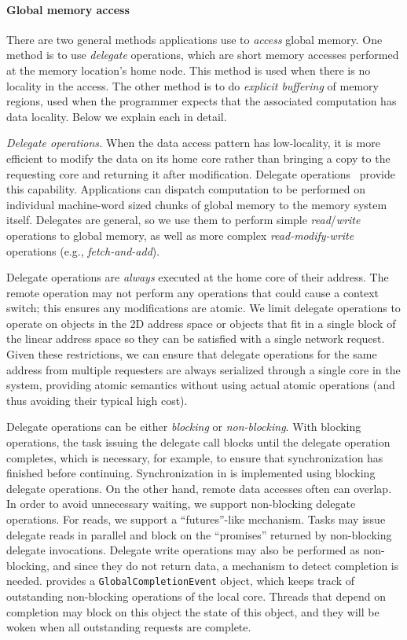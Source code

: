 \paragraph{Global memory access} There are two general methods \Grappa
applications use to {\em access} global memory. One method is to use {\em
delegate} operations, which are short memory accesses performed at the memory
location's home node. This method is used when there is no locality in the
access. The other method is to do {\em explicit buffering} of memory regions,
used when the programmer expects that the associated computation has data
locality. Below we explain each in detail.


\vspace{1ex} \textit{Delegate operations.} When the data access pattern has
low-locality, it is more efficient to modify the data on its home core rather
than bringing a copy to the requesting core and returning it after
modification. Delegate operations~\cite{Nelson:hotpar11, delegated:oopsla11}
provide this capability. Applications can dispatch computation to be performed
on individual machine-word sized chunks of global memory to the memory system
itself. Delegates are general, so we use them to perform simple
\emph{read\/}/\emph{write\/} operations to global memory, as well as more complex \emph{read-modify-write\/} operations (e.g., \emph{fetch-and-add\/}). 

Delegate operations are \emph{always\/} executed at the home core of their
address. The remote operation may not perform any operations that could cause
a context switch; this ensures any modifications are atomic. We limit delegate
operations to operate on objects in the 2D address space or objects that fit
in a single block of the linear address space so they can be satisfied with a
single network request. Given these restrictions, we can ensure that delegate
operations for the same address from multiple requesters are always serialized
through a single core in the system, providing atomic semantics without using
actual atomic operations (and thus avoiding their typical high cost).

Delegate operations can be either {\em blocking} or {\em non-blocking}.
With blocking operations, the task issuing the delegate call blocks until
the delegate operation completes, which is necessary, for example, to ensure
that synchronization has finished before continuing. Synchronization in \Grappa
is implemented using blocking delegate operations. On the other hand, remote data
accesses often can overlap. In order to avoid
unnecessary waiting, we support non-blocking delegate operations. For reads,
we support a ``futures''-like mechanism. Tasks may issue delegate reads in
parallel and block on the ``promises'' returned by non-blocking delegate
invocations. Delegate write operations may also be performed as
non-blocking,
and since they do not return data, a mechanism to detect completion is needed.
\Grappa provides a \texttt{GlobalCompletionEvent} object, which keeps track of
outstanding non-blocking operations of the local core. Threads that depend on completion may block on this object
the state of this object, and they will be woken when all outstanding requests are
complete. 

